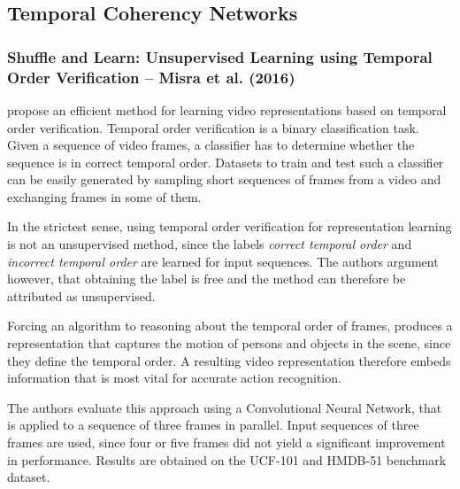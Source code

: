 \subsection{Temporal Coherency Networks}

\subsubsection[Shuffle and Learn: Unsupervised Learning using Temporal Order Verification (2016)]{Shuffle and Learn: Unsupervised Learning using Temporal Order Verification -- Misra et al. (2016)}
\textcite{misra_shuffle_2016} propose an efficient method for learning video representations based on temporal order verification.
Temporal order verification is a binary classification task.
Given a sequence of video frames, a classifier has to determine whether the sequence is in correct temporal order.
Datasets to train and test such a classifier can be easily generated by sampling short sequences of frames from a video and exchanging frames in some of them.

In the strictest sense, using temporal order verification for representation learning is not an unsupervised method, since the labels \textit{correct temporal order} and \textit{incorrect temporal order} are learned for input sequences.
The authors argument however, that obtaining the label is free and the method can therefore be attributed as unsupervised.

Forcing an algorithm to reasoning about the temporal order of frames, produces a representation that captures the motion of persons and objects in the scene, since they define the temporal order.
A resulting video representation therefore embeds information that is most vital for accurate action recognition.

The authors evaluate this approach using a Convolutional Neural Network, that is applied to a sequence of three frames in parallel.
Input sequences of three frames are used, since four or five frames did not yield a significant improvement in performance.
Results are obtained on the UCF-101 and HMDB-51 benchmark dataset.

